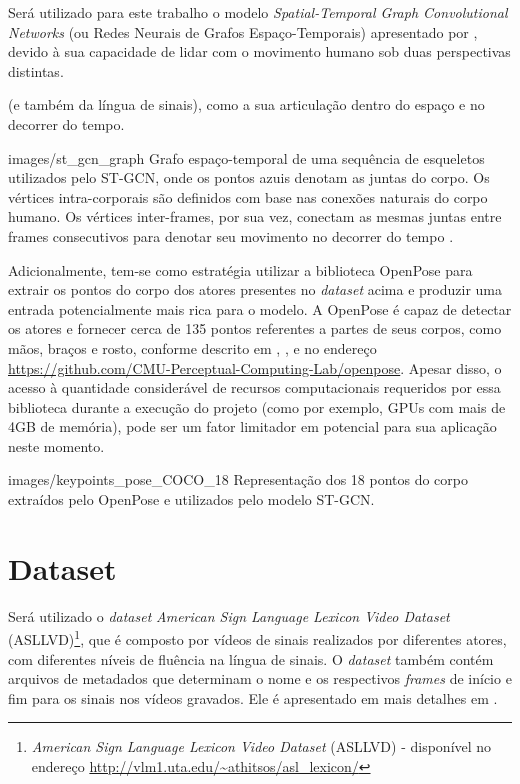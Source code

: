 Será utilizado para este trabalho o modelo \textit{Spatial-Temporal Graph Convolutional Networks} (ou Redes Neurais de Grafos Espaço-Temporais) apresentado por \cite{st-gcn-2018}, devido à sua capacidade de lidar com o movimento humano sob duas perspectivas distintas. 

(e também da língua de sinais), como a sua articulação dentro do espaço e no decorrer do tempo.

    {images/st_gcn_graph}
    {Grafo espaço-temporal de uma sequência de esqueletos utilizados pelo ST-GCN, onde os pontos azuis denotam as juntas do corpo. Os vértices intra-corporais são definidos com base nas conexões naturais do corpo humano. Os vértices inter-frames, por sua vez, conectam as mesmas juntas entre frames consecutivos para denotar seu movimento no decorrer do tempo \cite{st-gcn-2018}.}


Adicionalmente, tem-se como estratégia utilizar a biblioteca OpenPose para extrair os pontos do corpo dos atores presentes no \textit{dataset} acima e produzir uma entrada potencialmente mais rica para o modelo. A OpenPose é capaz de detectar os atores e fornecer cerca de 135 pontos referentes a partes de seus corpos, como mãos, braços e rosto, conforme descrito em \cite{cao-realtime-2017}, \cite{simon-hand-2017}, \cite{wei-cpm-2016} e no endereço \url{https://github.com/CMU-Perceptual-Computing-Lab/openpose}. Apesar disso, o acesso à quantidade considerável de recursos computacionais requeridos por essa biblioteca durante a execução do projeto (como por exemplo, GPUs com mais de 4GB de memória), pode ser um fator limitador em potencial para sua aplicação neste momento.

    {images/keypoints_pose_COCO_18}
    {Representação dos 18 pontos do corpo extraídos pelo OpenPose e utilizados pelo modelo ST-GCN.}


\section{Dataset}
\label{sec:dados-utilizados}
Será utilizado o \textit{dataset} \textit{American Sign Language Lexicon Video Dataset} (ASLLVD)\footnote{\textit{American Sign Language Lexicon Video Dataset} (ASLLVD) - disponível no endereço \url{http://vlm1.uta.edu/~athitsos/asl_lexicon/}}, que é composto por vídeos de sinais realizados por diferentes atores, com diferentes níveis de fluência na língua de sinais. O \textit{dataset} também contém arquivos de metadados que determinam o nome e os respectivos \textit{frames} de início e fim para os sinais nos vídeos gravados. Ele é apresentado em mais detalhes em \cite{athitsos-asldataset-2008}.

